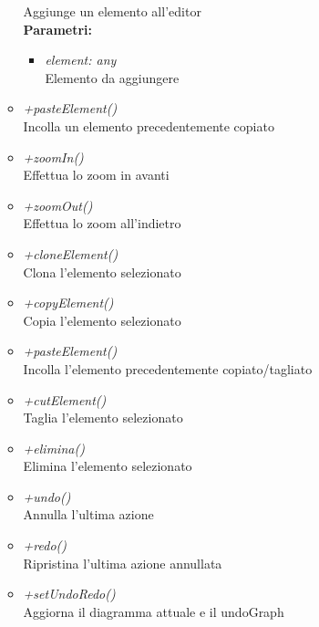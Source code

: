 \begin{itemize}
\begin{itemize}
    		Aggiunge un elemento all'editor\\
    		\textbf{Parametri:}
    		\begin{itemize}
    			\item \emph{element: any}\\
    			Elemento da aggiungere
    		\end{itemize}
    		\item \emph{+pasteElement()}\\
    		Incolla un elemento precedentemente copiato
    		\item \emph{+zoomIn()}\\
    		Effettua lo zoom in avanti
    		\item \emph{+zoomOut()}\\
    		Effettua lo zoom all'indietro
    		\item \emph{+cloneElement()}\\
    		Clona l'elemento selezionato
    		\item \emph{+copyElement()}\\
    		Copia l'elemento selezionato
    		\item \emph{+pasteElement()}\\
    		Incolla l'elemento precedentemente copiato/tagliato
    		\item \emph{+cutElement()}\\
    		Taglia l'elemento selezionato
    		\item \emph{+elimina()}\\
    		Elimina l'elemento selezionato
    		\item \emph{+undo()}\\
    		Annulla l'ultima azione
    		\item \emph{+redo()}\\
    		Ripristina l'ultima azione annullata
    		\item \emph{+setUndoRedo()}\\
    		Aggiorna il diagramma attuale e il undoGraph
		\end{itemize}
\end{itemize}